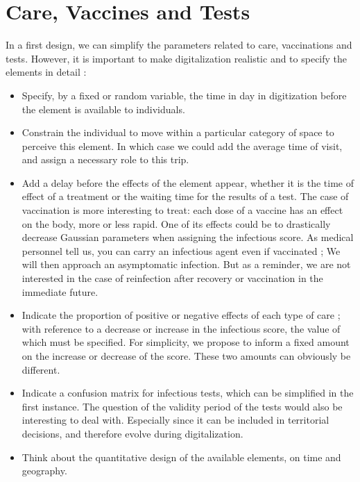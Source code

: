 \section{Care, Vaccines and Tests}

In a first design, we can simplify the parameters related to care, vaccinations and tests. However, it is important to make digitalization realistic and to specify the elements in detail :\\

\begin{itemize}
\item Specify, by a fixed or random variable, the time in day in digitization before the element is available to individuals.
\item Constrain the individual to move within a particular category of space to perceive this element. In which case we could add the average time of visit, and assign a necessary role to this trip.
\item Add a delay before the effects of the element appear, whether it is the time of effect of a treatment or the waiting time for the results of a test. The case of vaccination is more interesting to treat: each dose of a vaccine has an effect on the body, more or less rapid. One of its effects could be to drastically decrease Gaussian parameters when assigning the infectious score. As medical personnel tell us, you can carry an infectious agent even if vaccinated ; We will then approach an asymptomatic infection. But as a reminder, we are not interested in the case of reinfection after recovery or vaccination in the immediate future.
\item Indicate the proportion of positive or negative effects of each type of care ; with reference to a decrease or increase in the infectious score, the value of which must be specified. For simplicity, we propose to inform a fixed amount on the increase or decrease of the score. These two amounts can obviously be different.
\item Indicate a confusion matrix for infectious tests, which can be simplified in the first instance. The question of the validity period of the tests would also be interesting to deal with. Especially since it can be included in territorial decisions, and therefore evolve during digitalization.
\item Think about the quantitative design of the available elements, on time and geography.\\
\end{itemize}

